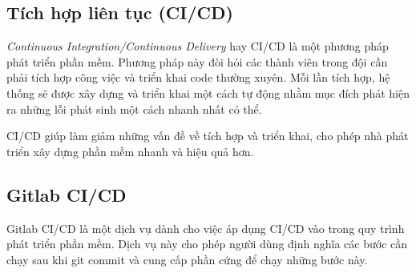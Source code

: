\documentclass[./../main.tex]{subfiles}
\begin{document}
\hypertarget{tuxedch-hux1ee3p-liuxean-tux1ee5c-cicd}{%
	\subsection{Tích hợp liên tục
		(CI/CD)}\label{tuxedch-hux1ee3p-liuxean-tux1ee5c-cicd}}

\emph{Continuous Integration/Continuous Delivery} hay CI/CD \cite{CICD22} là một
phương pháp phát triển phần mềm. Phương pháp này đòi hỏi các thành viên
trong đội cần phải tích hợp công việc và triển khai code thường xuyên.
Mỗi lần tích hợp, hệ thống sẽ được xây dựng và triển khai một cách tự
động nhằm mục đích phát hiện ra những lỗi phát sinh một cách nhanh nhất
có thể.

CI/CD giúp làm giảm những vấn đề về tích hợp và triển khai, cho phép nhà
phát triển xây dựng phần mềm nhanh và hiệu quả hơn.

\hypertarget{gitlab-cicd}{%
	\subsection{Gitlab CI/CD}\label{gitlab-cicd}}

Gitlab CI/CD \cite{Git22} là một dịch vụ dành cho việc áp dụng CI/CD vào trong quy
trình phát triển phần mềm. Dịch vụ này cho phép người dùng định nghĩa
các bước cần chạy sau khi git commit và cung cấp phần cứng để chạy những
bước này.
\end{document}
